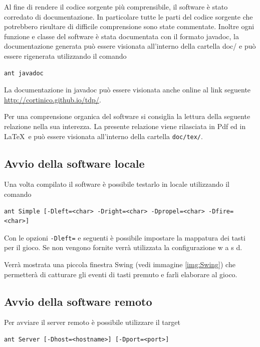 \documentclass[a4paper,12pt]{article}
\begin{document}
Al fine di rendere il codice sorgente pi\`u comprensibile, il software \`e stato corredato di documentazione. In particolare tutte le parti del codice sorgente che potrebbero risultare di difficile comprensione sono state commentate. Inoltre ogni funzione e classe del software \`e stata documentata con il formato \textsf {javadoc}, la documentazione generata pu\`o essere visionata all'interno della cartella \textsf{doc/} e pu\`o essere rigenerata utilizzando il comando
\begin{lstlisting}[basicstyle=\ttfamily]
ant javadoc
\end{lstlisting}

La documentazione in javadoc pu\`o essere visionata anche online al link seguente \url{http://cortinico.github.io/tdp/}.

Per una comprensione organica del software si consiglia la lettura della seguente relazione nella sua interezza. La presente relazione viene rilasciata in Pdf ed in \LaTeX\ e pu\`o essere visionata all'interno della cartella \texttt{doc/tex/}.

\subsection{Avvio della software locale}

Una volta compilato il software \`e possibile testarlo in locale utilizzando il comando
\begin{lstlisting}[basicstyle=\ttfamily]
ant Simple [-Dleft=<char> -Dright=<char> -Dpropel=<char> -Dfire=<char>]
\end{lstlisting}

Con le opzioni \texttt{-Dleft=} e seguenti \`e possibile impostare la mappatura dei tasti per il gioco. Se non vengono fornite verr\`a utilizzata la configurazione \textsf{w a s d}.

Verr\`a mostrata una piccola finestra Swing (vedi immagine \ref{img:Swing}) che permetter\`a di catturare gli eventi di tasti premuto e farli elaborare al gioco.

\subsection{Avvio della software remoto}

Per avviare il server remoto \`e possibile utilizzare il target
\begin{lstlisting}[basicstyle=\ttfamily]
ant Server [-Dhost=<hostname>] [-Dport=<port>]
\end{lstlisting}
\end{document}

